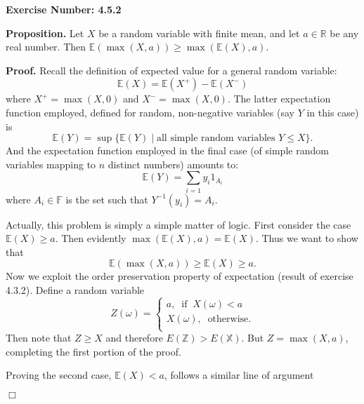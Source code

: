 \documentclass{article}
\begin{document}
\noindent \textbf{Exercise Number: 4.5.2}  %

\medskip 

\noindent \textbf{Proposition.} Let $X$ be a random variable with finite mean, and let $a \in \mathbb{R}$ be any real number. Then $\mathbb{E}(\max(X,a)) \geq \max(\mathbb{E}(X), a)$. 

\bigskip

\noindent \textbf{Proof.} Recall the definition of expected value for a general random variable: \[\mathbb{E}(X) = \mathbb{E}(X^+) - \mathbb{E}(X^-)\] where $X^+ = \max(X,0)$ and $X^- = \max(X,0)$. The latter expectation function employed, defined for random, non-negative variables (say $Y$ in this case) is \[\mathbb{E}(Y) = \sup\{\mathbb{E}(Y) \mid \text{all simple random variables }  Y \leq X\}.\] And the expectation function employed in the final case (of simple random variables mapping to $n$ distinct numbers) amounts to: \[\mathbb{E}(Y) = \sum_{i = 1} y_i 1_{A_i} \] where $A_i \in \mathbb{F}$ is the set such that $Y^{-1}(y_i) = A_i$.

Actually, this problem is simply a simple matter of logic. First consider the case $\mathbb{E}(X) \geq a$. Then evidently $\max(\mathbb{E}(X), a) = \mathbb{E}(X)$. Thus we want to show that \[\mathbb{E}(\max(X,a)) \geq \mathbb{E}(X) \geq a.\] Now we exploit the order preservation property of expectation (result of exercise 4.3.2). Define a random variable \[Z(\omega) = \begin{cases} a, \;\; \text{if} \;\; X(\omega) < a \\ X(\omega), \; \;\text{otherwise}.\\ \end{cases}\] Then note that $Z \geq X$ and therefore $E(\mathbb{Z}) > E(\mathbb{X})$. But $Z = \max(X,a)$, completing the first
portion of the proof. 

\medskip

\noindent Proving the second case, $\mathbb{E}(X) < a$, follows a similar line of argument 

\hfill $\Box$
\end{document}
